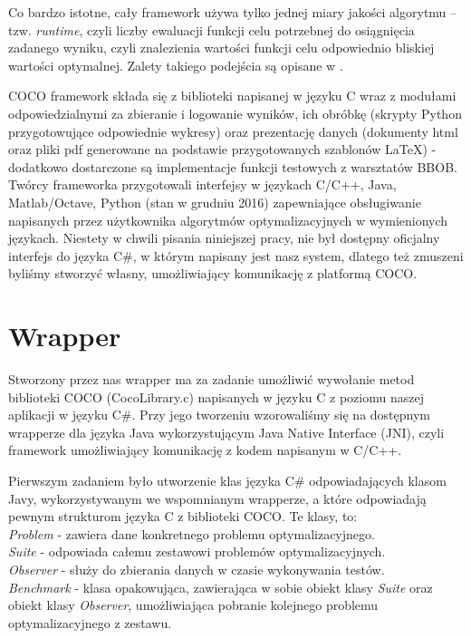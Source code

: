 \documentclass[12pt, twoside, openany, abstract=on]{report}
\theoremstyle{definition}
\begin{document}
Co bardzo istotne, cały framework używa tylko jednej miary jakości algorytmu – tzw. \textit{runtime}, czyli liczby ewaluacji funkcji celu potrzebnej do osiągnięcia zadanego wyniku, czyli znalezienia wartości funkcji celu odpowiednio bliskiej wartości optymalnej. Zalety takiego podejścia są opisane w \cite{CocoPlatform}.

COCO framework składa się z biblioteki napisanej w języku C wraz z modułami odpowiedzialnymi za zbieranie i logowanie wyników, ich obróbkę (skrypty Python przygotowujące odpowiednie wykresy) oraz prezentację danych (dokumenty html oraz pliki pdf generowane na podstawie przygotowanych szablonów LaTeX) - dodatkowo dostarczone są implementacje funkcji testowych z warsztatów BBOB. Twórcy frameworka przygotowali interfejsy w językach C/C++, Java, Matlab/Octave, Python (stan w grudniu 2016) zapewniające obsługiwanie napisanych przez użytkownika algorytmów optymalizacyjnych w wymienionych językach. Niestety w chwili pisania niniejszej pracy, nie był dostępny oficjalny interfejs do języka C\#, w którym napisany jest nasz system, dlatego też zmuszeni byliśmy stworzyć własny, umożliwiający komunikację z platformą COCO.

\section{Wrapper}

Stworzony przez nas wrapper ma za zadanie umożliwić wywołanie metod biblioteki COCO (CocoLibrary.c) napisanych w języku C z poziomu naszej aplikacji w języku C\#. Przy jego tworzeniu wzorowaliśmy się na dostępnym wrapperze dla języka Java wykorzystującym Java Native Interface (JNI), czyli framework umożliwiający komunikację z kodem napisanym w C/C++. 

Pierwszym zadaniem było utworzenie klas języka C\# odpowiadających klasom Javy, wykorzystywanym we wspomnianym wrapperze, a które odpowiadają pewnym strukturom języka C z biblioteki COCO. Te klasy, to:\\

\noindent \textit{Problem} - zawiera dane konkretnego problemu optymalizacyjnego.\\
\textit{Suite} - odpowiada całemu zestawowi problemów optymalizacyjnych.\\
\textit{Observer} - służy do zbierania danych w czasie wykonywania testów.\\
\textit{Benchmark} - klasa opakowująca, zawierająca w sobie obiekt klasy \textit{Suite} oraz obiekt klasy \textit{Observer}, umożliwiająca pobranie kolejnego problemu optymalizacyjnego z zestawu.\\
\end{document}

